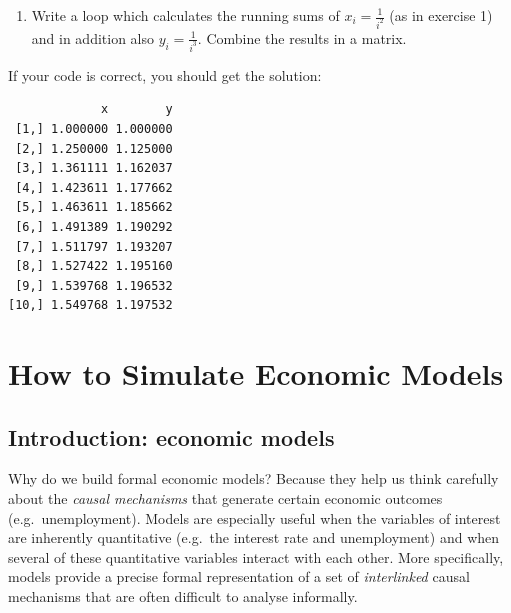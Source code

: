 \documentclass[
  letterpaper,
  DIV=11,
  numbers=noendperiod]{scrreprt}
\providecommand{\tightlist}{%
  \setlength{\itemsep}{0pt}\setlength{\parskip}{0pt}}\usepackage{longtable,booktabs,array}
\begin{document}
\begin{enumerate}
\def\labelenumi{\arabic{enumi}.}
\setcounter{enumi}{1}
\tightlist
\item
  Write a loop which calculates the running sums of
  \(x_i=\frac{1}{i^2}\) (as in exercise 1) and in addition also
  \(y_i=\frac{1}{i^3}\). Combine the results in a matrix.
\end{enumerate}

If your code is correct, you should get the solution:

\begin{tcolorbox}[enhanced jigsaw, titlerule=0mm, breakable, bottomrule=.15mm, toprule=.15mm, colbacktitle=quarto-callout-tip-color!10!white, rightrule=.15mm, toptitle=1mm, opacityback=0, left=2mm, coltitle=black, title=\textcolor{quarto-callout-tip-color}{\faLightbulb}\hspace{0.5em}{Solution}, colframe=quarto-callout-tip-color-frame, opacitybacktitle=0.6, leftrule=.75mm, bottomtitle=1mm, arc=.35mm, colback=white]

\begin{verbatim}
             x        y
 [1,] 1.000000 1.000000
 [2,] 1.250000 1.125000
 [3,] 1.361111 1.162037
 [4,] 1.423611 1.177662
 [5,] 1.463611 1.185662
 [6,] 1.491389 1.190292
 [7,] 1.511797 1.193207
 [8,] 1.527422 1.195160
 [9,] 1.539768 1.196532
[10,] 1.549768 1.197532
\end{verbatim}

\end{tcolorbox}


\chapter{How to Simulate Economic Models}\label{sec-how-to-simulate}

\section{Introduction: economic
models}\label{introduction-economic-models}

Why do we build formal economic models? Because they help us think
carefully about the \emph{causal mechanisms} that generate certain
economic outcomes (e.g.~unemployment). Models are especially useful when
the variables of interest are inherently quantitative (e.g.~the interest
rate and unemployment) and when several of these quantitative variables
interact with each other. More specifically, models provide a precise
formal representation of a set of \emph{interlinked} causal mechanisms
that are often difficult to analyse informally.
\end{document}
